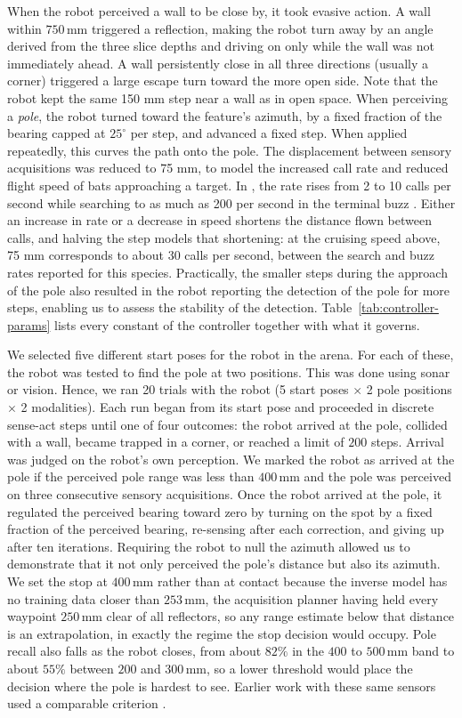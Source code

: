 \documentclass[11pt]{article}
\begin{document}
When the robot perceived a wall to be close by, it took evasive action. A wall within $750$\,mm triggered a reflection, making the robot turn away by an angle derived from the three slice depths and driving on only while the wall was not immediately ahead. A wall persistently close in all three directions (usually a corner) triggered a large escape turn toward the more open side. Note that the robot kept the same 150 mm step near a wall as in open space. When perceiving a \emph{pole}, the robot turned toward the feature's azimuth, by a fixed fraction of the bearing capped at $25^{\circ}$ per step, and advanced a fixed step. When applied repeatedly, this curves the path onto the pole. The displacement between sensory acquisitions was reduced to 75 mm, to model the increased call rate and reduced flight speed of bats approaching a target. In , the rate rises from 2 to 10 calls per second while searching to as much as 200 per second in the terminal buzz \citep{Ghose2006}. Either an increase in rate or a decrease in speed shortens the distance flown between calls, and halving the step models that shortening: at the cruising speed above, 75 mm corresponds to about 30 calls per second, between the search and buzz rates reported for this species. Practically, the smaller steps during the approach of the pole also resulted in the robot reporting the detection of the pole for more steps, enabling us to assess the stability of the detection. Table~\ref{tab:controller-params} lists every constant of the controller together with what it governs.


We selected five different start poses for the robot in the arena. For each of these, the robot was tested to find the pole at two positions. This was done using sonar or vision. Hence, we ran 20 trials with the robot (5 start poses $\times$ 2 pole positions $\times$ 2 modalities). Each run began from its start pose and proceeded in discrete sense-act steps until one of four outcomes: the robot arrived at the pole, collided with a wall, became trapped in a corner, or reached a limit of $200$ steps. Arrival was judged on the robot's own perception. We marked the robot as arrived at the pole if the perceived pole range was less than $400$\,mm and the pole was perceived on three consecutive sensory acquisitions. Once the robot arrived at the pole, it regulated the perceived bearing toward zero by turning on the spot by a fixed fraction of the perceived bearing, re-sensing after each correction, and giving up after ten iterations. Requiring the robot to null the azimuth allowed us to demonstrate that it not only perceived the pole's distance but also its azimuth. We set the stop at $400$\,mm rather than at contact because the inverse model has no training data closer than $253$\,mm, the acquisition planner having held every waypoint $250$\,mm clear of all reflectors, so any range estimate below that distance is an extrapolation, in exactly the regime the stop decision would occupy. Pole recall also falls as the robot closes, from about $82\%$ in the $400$ to $500$\,mm band to about $55\%$ between $200$ and $300$\,mm, so a lower threshold would place the decision where the pole is hardest to see. Earlier work with these same sensors used a comparable criterion \citep{Vanderelst2026}.
\end{document}
